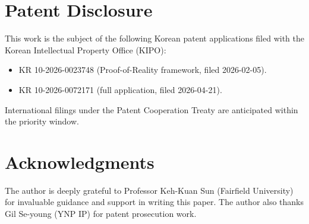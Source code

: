 \documentclass[11pt]{article}
\begin{document}
\section*{Patent Disclosure}

This work is the subject of the following Korean patent applications filed with
the Korean Intellectual Property Office (KIPO):

\begin{itemize}
  \item KR 10-2026-0023748 (Proof-of-Reality framework, filed 2026-02-05).
  \item KR 10-2026-0072171 (full application, filed 2026-04-21).
\end{itemize}

International filings under the Patent Cooperation Treaty are anticipated within
the priority window.

\section*{Acknowledgments}

The author is deeply grateful to Professor Keh-Kuan Sun (Fairfield University)
for invaluable guidance and support in writing this paper.
The author also thanks Gil Se-young (YNP IP) for patent prosecution work.
\end{document}
